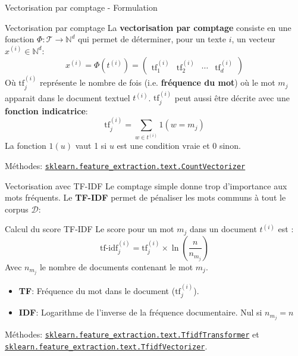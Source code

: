 \documentclass[10pt]{beamer}  %
\begin{document}
\begin{frame}{Vectorisation par comptage - Formulation}
	\begin{block}{Vectorisation par comptage}
		La \textbf{vectorisation par comptage} consiste en une fonction $\Phi: \mathcal{T} \to \mathbb{N}^d$ qui permet de déterminer, pour un texte $i$, un vecteur $x^{(i)} \in \mathbb{N}^d$:
		\begin{equation}
			x^{(i)} = \Phi(t^{(i)}) = \begin{pmatrix}
				\text{tf}^{(i)}_1 &	\text{tf}^{(i)}_2 &	\cdots & \text{tf}^{(i)}_d
			\end{pmatrix}
			\nonumber
		\end{equation}
		Où $\text{tf}^{(i)}_j$ représente le nombre de fois (i.e. \textbf{fréquence du mot}) où le mot $m_j$ apparait dans le document textuel $t^{(i)}$. $\text{tf}^{(i)}_j$ peut aussi être décrite avec une \textbf{fonction indicatrice}:
		\begin{equation}
			\text{tf}^{(i)}_j = \underset{w \in t^{(i)}}{\sum} 1(w = m_j)
			\nonumber
		\end{equation}
		La fonction $1(u)$ vaut 1 si $u$ est une condition vraie et 0 sinon.
	\end{block}
	\vfill
	Méthodes: \href{https://scikit-learn.org/stable/modules/generated/sklearn.feature_extraction.text.CountVectorizer.html}{\texttt{sklearn.feature\_extraction.text.CountVectorizer}}
\end{frame}

\begin{frame}{Vectorisation avec TF-IDF}
	Le comptage simple donne trop d'importance aux mots fréquents. Le \textbf{TF-IDF} permet de pénaliser les mots communs à tout le corpus $\mathcal{D}$:
	\begin{block}{Calcul du score TF-IDF}
		Le score pour un mot $m_j$ dans un document $t^{(i)}$ est :
		\begin{equation}
			\text{tf-idf}_j^{(i)} = \text{tf}_j^{(i)} \times \ln\left( \frac{n}{n_{m_j}} \right)
			\nonumber
		\end{equation}
		Avec $n_{m_j}$ le nombre de documents contenant le mot $m_j$.
	\end{block}
	\begin{itemize}
		\item \textbf{TF}: Fréquence du mot dans le document ($\text{tf}^{(i)}_j$).
		\item \textbf{IDF}: Logarithme de l'inverse de la fréquence documentaire. Nul si $n_{m_j} = n$
	\end{itemize}
	\vfill
	Méthodes: \href{https://scikit-learn.org/stable/modules/generated/sklearn.feature_extraction.text.TfidfTransformer.html}{\texttt{sklearn.feature\_extraction.text.TfidfTransformer}} et \href{https://scikit-learn.org/stable/modules/generated/sklearn.feature_extraction.text.TfidfVectorizer.html}{\texttt{sklearn.feature\_extraction.text.TfidfVectorizer}}.
\end{frame}
\end{document}
